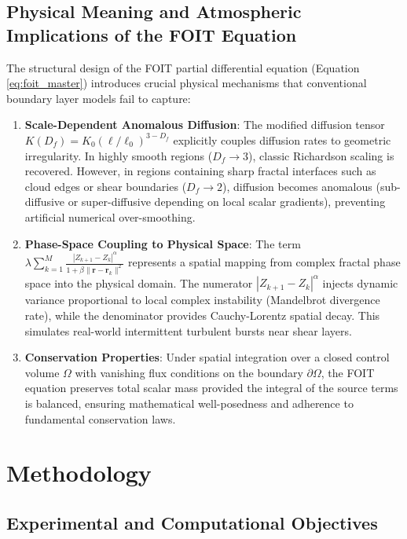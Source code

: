 \documentclass[11pt,a4paper]{article}
\begin{document}
\subsection{Physical Meaning and Atmospheric Implications of the FOIT Equation}

The structural design of the FOIT partial differential equation (Equation \ref{eq:foit_master}) introduces crucial physical mechanisms that conventional boundary layer models fail to capture:

\begin{enumerate}
    \item \textbf{Scale-Dependent Anomalous Diffusion}: The modified diffusion tensor $K(D_f) = K_0 (\ell / \ell_0)^{3 - D_f}$ explicitly couples diffusion rates to geometric irregularity. In highly smooth regions ($D_f \to 3$), classic Richardson scaling is recovered. However, in regions containing sharp fractal interfaces such as cloud edges or shear boundaries ($D_f \to 2$), diffusion becomes anomalous (sub-diffusive or super-diffusive depending on local scalar gradients), preventing artificial numerical over-smoothing.
    \item \textbf{Phase-Space Coupling to Physical Space}: The term $\lambda \sum_{k=1}^{M} \frac{|Z_{k+1} - Z_k|^\alpha}{1 + \beta \|\mathbf{r} - \mathbf{r}_k\|^2}$ represents a spatial mapping from complex fractal phase space into the physical domain. The numerator $|Z_{k+1} - Z_k|^\alpha$ injects dynamic variance proportional to local complex instability (Mandelbrot divergence rate), while the denominator provides Cauchy-Lorentz spatial decay. This simulates real-world intermittent turbulent bursts near shear layers.
    \item \textbf{Conservation Properties}: Under spatial integration over a closed control volume $\Omega$ with vanishing flux conditions on the boundary $\partial \Omega$, the FOIT equation preserves total scalar mass provided the integral of the source terms is balanced, ensuring mathematical well-posedness and adherence to fundamental conservation laws.
\end{enumerate}

\section{Methodology}

\subsection{Experimental and Computational Objectives}
\end{document}
